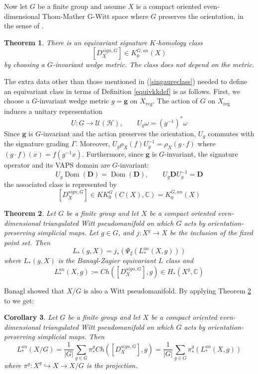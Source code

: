 \documentclass[11pt,leqno,twoside]{amsart}
\theoremstyle{plainsl}
\newtheorem{theorem}{Theorem}[section]
\newtheorem{corollary}[theorem]{Corollary}
\theoremstyle{definition}
\newcommand{\C}{\mathbb{C}}
\newcommand{\bD}{\mathbf{D}}
\begin{document}
Now let $G$ be a finite group and assume  $X$ is a compact oriented even-dimensional Thom-Mather G-Witt space where $G$ preserves the orientation, in the sense of \cite[\S2]{BLP}. 
\begin{theorem}\label{equivsingaureclass}
    \cite[Thm. 4.1]{BLP} There is an equivariant signature $K$-homology class $$\left[D_X^{sign,G}\right]\in K^{G,an}_0(X)$$ by choosing a $G$-invariant wedge metric. The class does not depend on the metric.
\end{theorem}
The extra data other than those mentioned in (\ref{singaureclass}) needed to define an equivariant class in terms of Definition
\ref{equivkkdef} is as follows.
First, we choose a  $G$-invariant wedge metric $g=\mathbf g$ on $X_{reg}$. 
The action of $G$ on $X_{\mathrm{reg}}$
induces a unitary representation
\begin{equation}\label{equivrepdef}
    U:G\longrightarrow\mathcal U(\mathcal H),
\qquad
U_g\omega=(g^{-1})^*\omega
\end{equation}
Since $\mathbf g$ is $G$-invariant and
the action preserves the orientation,
$U_g$ commutes with the signature grading
$\Gamma$. Moreover,
$
U_g\rho_X(f)U_g^{-1}
=\rho_X(g\cdot f)
$
where $(g\cdot f)(x)=f(g^{-1}x)$. Furthermore, since $\mathbf g$ is
$G$-invariant, the signature operator
and its VAPS domain are $G$-invariant:
\[
U_g\operatorname{Dom}(\bD)
=\operatorname{Dom}(\bD),
\qquad
U_g\bD U_g^{-1}=\bD
\]
 the associated class is represented by
\[
[D_X^{sign,G}]
\in KK_0^G(C(X),\C)=K^{G,an}_0(X)
\]




\begin{theorem}\label{Banagl_localization_comparison}\cite{A}
Let $G$ be a finite group and let $X$ be a compact oriented even-dimensional triangulated Witt pseudomanifold on which $G$ acts by orientation-preserving simplicial maps. Let $g\in G$, and 
$
j:X^g\rightarrow X
$
be the inclusion of the fixed point set. Then
\[
L^{}_*(g,X)=j_*(\Psi_2(L^{an}_*(X,g)))
\]
where $L_*(g,X)$ is the Banagl-Zagier equivariant $L$ class \cite{B} and
\[
L^{an}_*(X,g):=Ch(\left[D_X^{sign,G}\right],g)
\in H_*(X^g,\mathbb{C})
\]
\end{theorem}
Banagl \cite{B} showed that $X/G$ is also a Witt pseudomanifold. By applying Theorem \ref{Banagl_localization_comparison} to \cite[Thm. 10.1]{B}  we get:
  \begin{corollary}\label{averageLclass}\cite[Corollary 4.6]{A}
  Let $G$ be a finite group and let $X$ be a compact oriented even-dimensional triangulated Witt pseudomanifold on which $G$ acts by orientation-preserving simplicial maps. Then
    \begin{equation}\label{averageLclasseq}
        L^{an}_*(X/G)=\frac{1}{|G|}\sum_{g\in G} \pi^g_*Ch(\left[D_X^{sign,G}\right],g)=\frac{1}{|G|}\sum_{g\in G} \pi^g_*(L^{an}_*(X,g))
    \end{equation}
    where $\pi^g:X^g\hookrightarrow X\rightarrow X/G$ is the projection.
\end{corollary}
\end{document}
